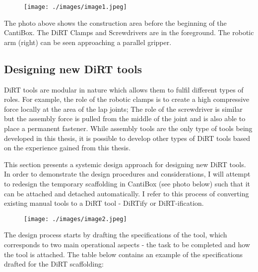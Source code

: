 \begin{figure}[H]
\texttt{[image: ./images/image1.jpeg]}
\end{figure}


The photo above shows the construction area before the beginning of the CantiBox. The DiRT Clamps and Screwdrivers are in the foreground. The robotic arm (right) can be seen approaching a parallel gripper. 

\subsection{Designing new DiRT tools}

DiRT tools are modular in nature which allows them to fulfil different types of roles. For example, the role of the robotic clamps is to create a high compressive force locally at the area of the lap joints; The role of the screwdriver is similar but the assembly force is pulled from the middle of the joint and is also able to place a permanent fastener. While assembly tools are the only type of tools being developed in this thesis, it is possible to develop other types of DiRT tools based on the experience gained from this thesis. 

This section presents a systemic design approach for designing new DiRT tools. In order to demonstrate the design procedures and considerations, I will attempt to redesign the temporary scaffolding in CantiBox (see photo below) such that it can be attached and detached automatically. I refer to this process of converting existing manual tools to a DiRT tool - DiRTify or DiRT-ification.

\begin{figure}[H]
\texttt{[image: ./images/image2.jpeg]}
\end{figure}


The design process starts by drafting the specifications of the tool, which corresponds to two main operational aspects - the task to be completed and how the tool is attached. The table below contains an example of the specifications drafted for the DiRT scaffolding:

